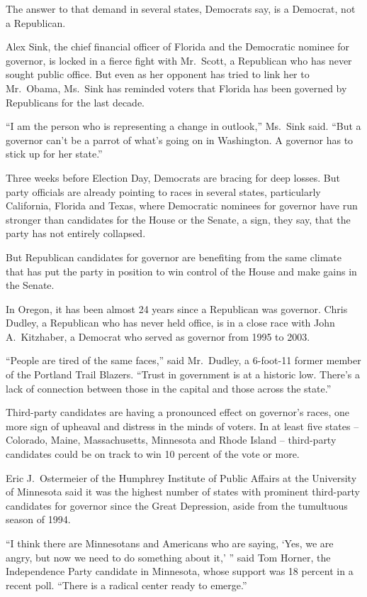 ﻿\documentclass[12pt]{article}
\begin{document}
The answer to that demand in several states, Democrats say, is a Democrat, not a Republican.

Alex Sink, the chief financial officer of Florida and the Democratic nominee for governor, is locked
in a fierce fight with Mr.~Scott, a Republican who has never sought public office. But even as her
opponent has tried to link her to Mr.~Obama, Ms.~Sink has reminded voters that Florida has been
governed by Republicans for the last decade.

``I am the person who is representing a change in outlook,'' Ms.~Sink said. ``But a governor can't
be a parrot of what's going on in Washington. A governor has to stick up for her state.''

Three weeks before Election Day, Democrats are bracing for deep losses. But party officials are
already pointing to races in several states, particularly California, Florida and Texas, where
Democratic nominees for governor have run stronger than candidates for the House or the Senate, a
sign, they say, that the party has not entirely collapsed.

But Republican candidates for governor are benefiting from the same climate that has put the party
in position to win control of the House and make gains in the Senate.

In Oregon, it has been almost 24 years since a Republican was governor. Chris Dudley, a Republican
who has never held office, is in a close race with John A.~Kitzhaber, a Democrat who served as
governor from 1995 to 2003.

``People are tired of the same faces,'' said Mr.~Dudley, a 6-foot-11 former member of the Portland
Trail Blazers. ``Trust in government is at a historic low. There's a lack of connection between
those in the capital and those across the state.''

Third-party candidates are having a pronounced effect on governor's races, one more sign of upheaval
and distress in the minds of voters. In at least five states -- Colorado, Maine, Massachusetts,
Minnesota and Rhode Island -- third-party candidates could be on track to win 10 percent of the vote
or more.

Eric J.~Ostermeier of the Humphrey Institute of Public Affairs at the University of Minnesota said
it was the highest number of states with prominent third-party candidates for governor since the
Great Depression, aside from the tumultuous season of 1994.

``I think there are Minnesotans and Americans who are saying, `Yes, we are angry, but now we need to
do something about it,' '' said Tom Horner, the Independence Party candidate in Minnesota, whose
support was 18 percent in a recent poll. ``There is a radical center ready to emerge.''
\end{document}
